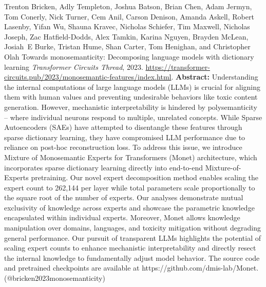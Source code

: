 \documentclass{article} %
\begin{document}
\begin{thebibliography}{}
 Trenton Bricken, Adly Templeton, Joshua Batson, Brian Chen, Adam Jermyn, Tom Conerly, Nick Turner, Cem Anil, Carson Denison, Amanda Askell, Robert Lasenby, Yifan Wu, Shauna Kravec, Nicholas Schiefer, Tim Maxwell, Nicholas Joseph, Zac Hatfield-Dodds, Alex Tamkin, Karina Nguyen, Brayden McLean, Josiah~E Burke, Tristan Hume, Shan Carter, Tom Henighan, and Christopher Olah \newblock Towards monosemanticity: Decomposing language models with dictionary learning \newblock \emph{Transformer Circuits Thread}, 2023. \newblock \url{https://transformer-circuits.pub/2023/monosemantic-features/index.html}. \newblock \textbf{Abstract:} Understanding the internal computations of large language models (LLMs) is crucial for aligning them with human values and preventing undesirable behaviors like toxic content generation. However, mechanistic interpretability is hindered by polysemanticity -- where individual neurons respond to multiple, unrelated concepts. While Sparse Autoencoders (SAEs) have attempted to disentangle these features through sparse dictionary learning, they have compromised LLM performance due to reliance on post-hoc reconstruction loss. To address this issue, we introduce Mixture of Monosemantic Experts for Transformers (Monet) architecture, which incorporates sparse dictionary learning directly into end-to-end Mixture-of-Experts pretraining. Our novel expert decomposition method enables scaling the expert count to 262,144 per layer while total parameters scale proportionally to the square root of the number of experts. Our analyses demonstrate mutual exclusivity of knowledge across experts and showcase the parametric knowledge encapsulated within individual experts. Moreover, Monet allows knowledge manipulation over domains, languages, and toxicity mitigation without degrading general performance. Our pursuit of transparent LLMs highlights the potential of scaling expert counts to enhance mechanistic interpretability and directly resect the internal knowledge to fundamentally adjust model behavior. The source code and pretrained checkpoints are available at https://github.com/dmis-lab/Monet. \newblock (@bricken2023monosemanticity)


\end{thebibliography}
\end{document}
